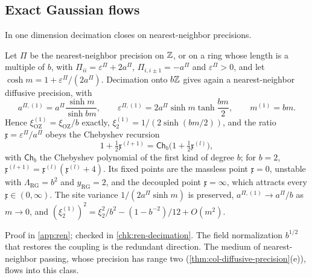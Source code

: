 \subsection{Exact Gaussian flows}\label{sec:ren-flows}

In one dimension decimation closes on nearest-neighbor precisions.

\begin{theorem}\label{thm:ren-decimation}
Let $\Pi$ be the nearest-neighbor precision on $\mathbb{Z}$, or on a ring whose length is a multiple of $b$, with $\Pi_{ii}=\varepsilon^\Pi+2a^\Pi$, $\Pi_{i,i\pm1}=-a^\Pi$ and $\varepsilon^\Pi>0$, and let $\cosh m=1+\varepsilon^\Pi/(2a^\Pi)$. Decimation onto $b\mathbb{Z}$ gives again a nearest-neighbor diffusive precision, with
\begin{equation}\label{eq:ren-decimation}
a^{\Pi,(1)}=a^\Pi\frac{\sinh m}{\sinh bm},\qquad\varepsilon^{\Pi,(1)}=2a^\Pi\sinh m\tanh\frac{bm}2,\qquad m^{(1)}=bm.
\end{equation}
Hence $\xi^{(1)}_{\mathrm{OZ}}=\xi_{\mathrm{OZ}}/b$ exactly, $\xi^{(1)}_2=1/(2\sinh(bm/2))$, and the ratio $\mathfrak x=\varepsilon^\Pi/a^\Pi$ obeys the Chebyshev recursion
\begin{equation}\label{eq:ren-chebyshev}
1+\tfrac12\mathfrak x^{(l+1)}=\mathsf{Ch}_b\bigl(1+\tfrac12\mathfrak x^{(l)}\bigr),
\end{equation}
with $\mathsf{Ch}_b$ the Chebyshev polynomial of the first kind of degree $b$; for $b=2$, $\mathfrak x^{(l+1)}=\mathfrak x^{(l)}(\mathfrak x^{(l)}+4)$. Its fixed points are the massless point $\mathfrak x=0$, unstable with $\Lambda_{\mathrm{RG}}=b^2$ and $y_{\mathrm{RG}}=2$, and the decoupled point $\mathfrak x=\infty$, which attracts every $\mathfrak x\in(0,\infty)$. The site variance $1/(2a^\Pi\sinh m)$ is preserved, $a^{\Pi,(1)}\to a^\Pi/b$ as $m\to0$, and $(\xi^{(1)}_2)^2=\xi_2^2/b^2-(1-b^{-2})/12+O(m^2)$.
\end{theorem}
Proof in \cref{app:ren}; checked in \cref{chk:ren-decimation}. The field normalization $b^{1/2}$ that restores the coupling is the redundant direction. The medium of nearest-neighbor passing, whose precision has range two (\cref{thm:col-diffusive-precision}(e)), flows into this class.

